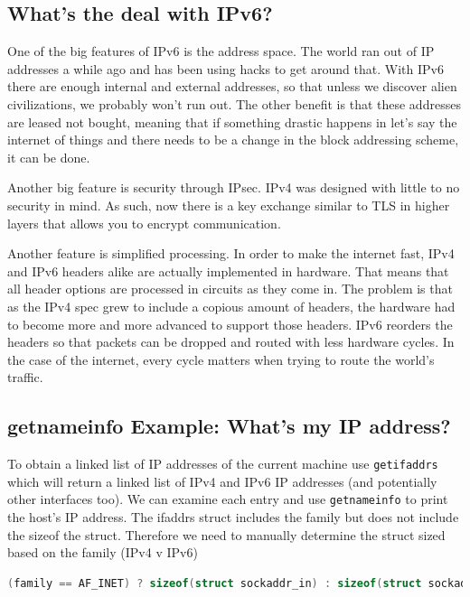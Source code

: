 \begin{aside}
\subsection{What's the deal with IPv6?}

One of the big features of IPv6 is the address space. The world ran out of IP addresses a while ago and has been using hacks to get around that. With IPv6 there are enough internal and external addresses, so that unless we discover alien civilizations, we probably won't run out. The other benefit is that these addresses are leased not bought, meaning that if something drastic happens in let's say the internet of things and there needs to be a change in the block addressing scheme, it can be done.

Another big feature is security through IPsec. IPv4 was designed with little to no security in mind. As such, now there is a key exchange similar to TLS in higher layers that allows you to encrypt communication.

Another feature is simplified processing. In order to make the internet fast, IPv4 and IPv6 headers alike are actually implemented in hardware. That means that all header options are processed in circuits as they come in. The problem is that as the IPv4 spec grew to include a copious amount of headers, the hardware had to become more and more advanced to support those headers. IPv6 reorders the headers so that packets can be dropped and routed with less hardware cycles. In the case of the internet, every cycle matters when trying to route the world's traffic.

\end{aside}

\subsection{getnameinfo Example: What's my IP address?}\label{getnameinfo-example-whats-my-ip-address}

To obtain a linked list of IP addresses of the current machine use \texttt{getifaddrs} which will return a linked list of IPv4 and IPv6 IP addresses (and potentially other interfaces too). We can examine each entry and use \texttt{getnameinfo} to print the host's IP address. The ifaddrs struct includes the family but does not include the sizeof the struct. Therefore we need to manually determine the struct sized based on the family (IPv4 v IPv6)

\begin{lstlisting}[language=C]
 (family == AF_INET) ? sizeof(struct sockaddr_in) : sizeof(struct sockaddr_in6)
\end{lstlisting}

